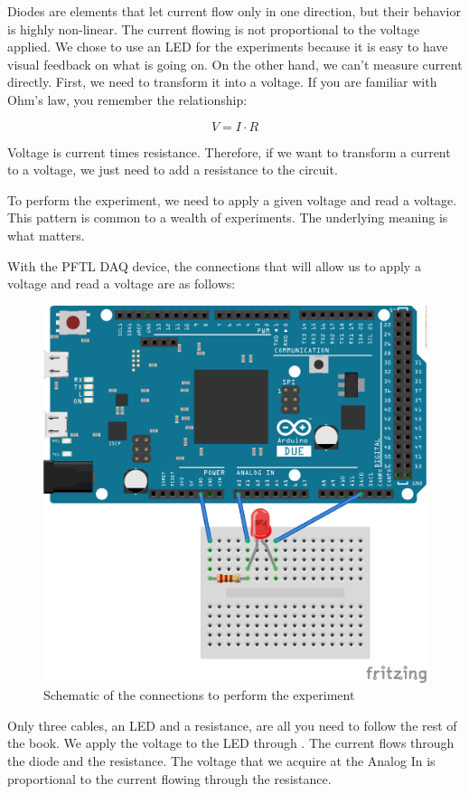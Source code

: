 Diodes are elements that let current flow only in one direction, but their behavior is highly non-linear. The current flowing is not proportional to the voltage applied. We chose to use an LED for the experiments because it is easy to have visual feedback on what is going on. On the other hand, we can't measure current directly. First, we need to transform it into a voltage. If you are familiar with Ohm's law, you remember the relationship:

\begin{equation}
V = I \cdot R
\end{equation}

Voltage is current times resistance. Therefore, if we want to transform a current to a voltage, we just need to add a resistance to the circuit.

To perform the experiment, we need to apply a given voltage and read a  voltage. This pattern is common to a wealth of experiments. The underlying meaning is what matters.

With the {PFTL DAQ} device, the connections that will allow us to apply a voltage and read a voltage are as follows:

\begin{figure}
\centering
\includegraphics[width=.5\textwidth]{images/Chapter_03/IV_scheme_bb.png}
\caption{Schematic of the connections to perform the experiment}
\end{figure}

Only three cables, an LED and a resistance, are all you need to follow the rest of the book. We apply the voltage to the LED through . The current flows through the diode and the resistance. The voltage that we acquire at the Analog In  is proportional to the current flowing through the resistance.


